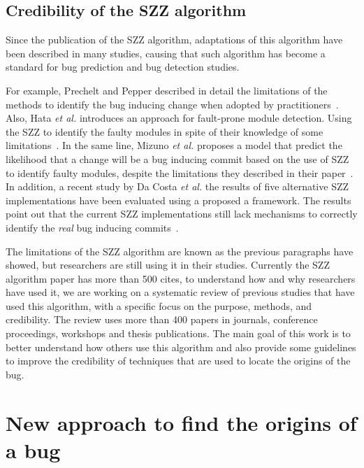 \documentclass[a4paper]{article}
\begin{document}
\subsection{Credibility of the SZZ algorithm}

Since the publication of the SZZ algorithm, adaptations of this algorithm have been described in many studies, causing that such algorithm has become a standard for bug prediction and bug detection studies.

For example, Prechelt and Pepper described in detail the limitations of the methods to identify the bug inducing change when adopted by practitioners~\cite{prechelt2014software}. Also, Hata \emph{et al.} introduces an approach for fault-prone module detection. Using the SZZ to  identify the faulty modules in spite of their knowledge of some limitations~\cite{hata2010fault}. In the same line, Mizuno \emph{et al.} proposes a model that predict the likelihood that a change will be a bug inducing commit based on the use of SZZ to identify faulty modules, despite the limitations they described in their paper~\cite{mizuno2010prediction}. In addition, a recent study by Da Costa \emph{et al.} the results of five alternative SZZ implementations have been evaluated using a proposed a framework. The results point out that the current SZZ implementations still lack mechanisms to correctly identify the \emph{real} bug inducing commits~\cite{da2016framework}.

The limitations of the SZZ algorithm are known as the previous paragraphs have showed, but researchers are still using it in their studies. Currently the SZZ algorithm paper has more than 500 cites, to understand how and why researchers have used it, we are working on a systematic review of previous studies that have used this algorithm, with a specific focus on the purpose, methods, and credibility. The review uses more than 400 papers in journals, conference proceedings, workshops and thesis publications. The main goal of this work is to better understand how others use this algorithm and also provide some guidelines to improve the credibility of techniques that are used to locate the origins of the bug.

\section{New approach to find the origins of a bug}
\end{document}
